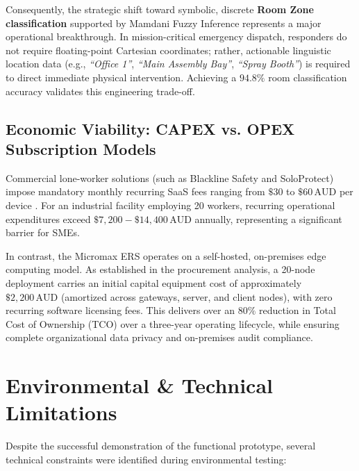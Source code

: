 Consequently, the strategic shift toward symbolic, discrete \textbf{Room Zone classification} supported by Mamdani Fuzzy Inference represents a major operational breakthrough. In mission-critical emergency dispatch, responders do not require floating-point Cartesian coordinates; rather, actionable linguistic location data (e.g., \textit{``Office 1''}, \textit{``Main Assembly Bay''}, \textit{``Spray Booth''}) is required to direct immediate physical intervention. Achieving a $94.8\%$ room classification accuracy validates this engineering trade-off.

\subsection{Economic Viability: CAPEX vs. OPEX Subscription Models}
Commercial lone-worker solutions (such as Blackline Safety and SoloProtect) impose mandatory monthly recurring SaaS fees ranging from $\$30$ to $\$60\,\text{AUD}$ per device \cite{lone_worker_safety_review}. For an industrial facility employing 20 workers, recurring operational expenditures exceed $\$7,200 - \$14,400\,\text{AUD}$ annually, representing a significant barrier for SMEs.

In contrast, the Micromax ERS operates on a self-hosted, on-premises edge computing model. As established in the procurement analysis, a 20-node deployment carries an initial capital equipment cost of approximately $\$2,200\,\text{AUD}$ (amortized across gateways, server, and client nodes), with zero recurring software licensing fees. This delivers over an $80\%$ reduction in Total Cost of Ownership (TCO) over a three-year operating lifecycle, while ensuring complete organizational data privacy and on-premises audit compliance.

\section{Environmental \& Technical Limitations}
Despite the successful demonstration of the functional prototype, several technical constraints were identified during environmental testing:

